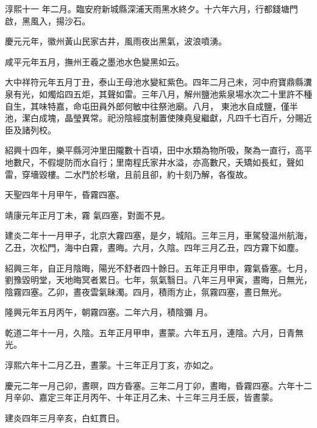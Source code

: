 \begin{pinyinscope}
 淳熙十一
 年二月。臨安府新城縣深浦天雨黑水終夕。十六年六月，行都錢塘門啟，黑風入，揚沙石。



 慶元元年，徽州黃山民家古井，風雨夜出黑氣，波浪噴湧。



 咸平元年五月，撫州王羲之墨池水色變黑如云。



 大中祥符元年五月丁丑，泰山王母池水變紅紫色。四年二月己未，河中府寶鼎縣瀵泉有光，如燭焰四五炬，其聲如雷。三年八月，解州鹽池紫泉場水次二十里許不種自生，其味特嘉，命屯田員外郎何敏中往祭池廟。八月，
 東池水自成鹽，僅半池，潔白成塊，晶瑩異常。祀汾陰經度制置使陳堯叟繼獻，凡四千七百斤，分賜近臣及諸列校。



 紹興十四年，樂平縣河沖里田隴數十百頃，田中水類為物所吸，聚為一直行，高平地數尺，不假堤防而水自行；里南程氏家井水溢，亦高數尺，夭矯如長虹，聲如雷，穿墻毀樓。二水鬥於杉墩，且前且卻，約十刻乃解，各復故。



 天聖四年十月甲午，昏霧四塞。



 靖康元年正月丁未，霧
 氣四塞，對面不見。



 建炎二年十一月甲子，北京大霧四塞，是夕，城陷。三年三月，車駕發溫州航海，乙丑，次松門，海中白霧，晝晦。六月，久陰。四年三月乙丑，四方霧下如塵。



 紹興三年，自正月陰晦，陽光不舒者四十餘日。五年正月甲申，霧氣昏塞。七月，劉豫毀明堂，天地晦冥者累日。七年，氛氣翳日。八年三月甲寅，晝晦，日無光，陰霧四塞。乙卯，晝夜雲氣昧濁。四月，積雨方止，氛霧四塞，晝日無光。



 隆興元年五月丙午，朝霧四塞。二年六月，積陰彌
 月。



 乾道二年十一月，久陰。五年正月甲申，晝蒙。六年五月，連陰。六月，日青無光。



 淳熙六年十二月乙丑，晝蒙。十三年正月丁亥，亦如之。



 慶元二年一月己卯，晝暝，四方昏塞。三年二月丁卯，晝晦，昏霧四塞。六年十二月辛卯、嘉定三年正月丙午、十年正月乙未、十三年三月壬辰，皆晝蒙。



 建炎四年三月辛亥，白虹貫日。




\end{pinyinscope}
